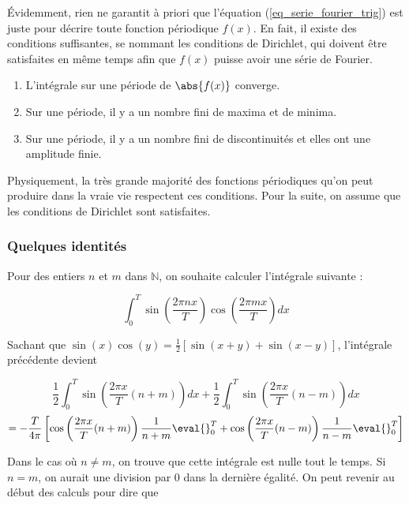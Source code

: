 Évidemment, rien ne garantit à priori que l'équation (\ref{eq_serie_fourier_trig}) est juste pour décrire toute fonction périodique $f(x)$. En fait, il existe des conditions suffisantes, se nommant les conditions de Dirichlet, qui doivent être satisfaites en même temps afin que $f(x)$ puisse avoir une série de Fourier. 

\begin{enumerate}
    \item L'intégrale sur une période de $\abs{f(x)}$ converge.
    \item Sur une période, il y a un nombre fini de maxima et de minima.
    \item Sur une période, il y a un nombre fini de discontinuités et elles ont une amplitude finie.
\end{enumerate}

Physiquement, la très grande majorité des fonctions périodiques qu'on peut produire dans la vraie vie respectent ces conditions. Pour la suite, on assume que les conditions de Dirichlet sont satisfaites.

\subsubsection{Quelques identités}
Pour des entiers $n$ et $m$ dans $\mathbb{N}$, on souhaite calculer l'intégrale suivante :

\begin{equation*}
    \int_{0}^{T}\sin(\frac{2\pi nx}{T})\cos(\frac{2\pi mx}{T})dx
\end{equation*}

Sachant que $\sin(x)\cos(y) = \frac{1}{2}\left[\sin(x+y) + \sin(x-y)\right]$, l'intégrale précédente devient 

\begin{equation*}
    \frac{1}{2}\int_{0}^{T}\sin\left(\frac{2\pi x}{T}(n+m)\right)dx + \frac{1}{2}\int_{0}^{T}\sin\left(\frac{2\pi x}{T}(n-m)\right)dx 
\end{equation*}
\begin{equation*}
    = -\frac{T}{4\pi}\left[\cos\left(\frac{2\pi x}{T}(n+m)\right)\frac{1}{n+m}\eval{}_{0}^{T} + \cos\left(\frac{2\pi x}{T}(n-m)\right)\frac{1}{n-m}\eval{}_{0}^{T}\right]
\end{equation*}

Dans le cas où $n\neq m$, on trouve que cette intégrale est nulle tout le temps. Si $n=m$, on aurait une division par 0 dans la dernière égalité. On peut revenir au début des calculs pour dire que 

